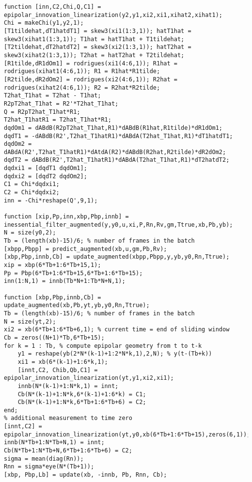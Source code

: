 \documentclass[]{article}
\begin{document}
\begin{tiny}
\begin{verbatim}
function [inn,C2,Chi,Q,C1] = epipolar_innovation_linearization(y2,y1,xi2,xi1,xihat2,xihat1);
Chi = makeChi(y1,y2,1); 
[T1tildehat,dT1hatdT1] = skew3(xi1(1:3,1)); hatT1hat = skew3(xihat1(1:3,1)); T1hat = hatT1hat + T1tildehat; 
[T2tildehat,dT2hatdT2] = skew3(xi2(1:3,1)); hatT2hat = skew3(xihat2(1:3,1)); T2hat = hatT2hat + T2tildehat; 
[R1tilde,dR1dOm1] = rodrigues(xi1(4:6,1)); R1hat = rodrigues(xihat1(4:6,1)); R1 = R1hat*R1tilde;
[R2tilde,dR2dOm2] = rodrigues(xi2(4:6,1)); R2hat = rodrigues(xihat2(4:6,1)); R2 = R2hat*R2tilde;
T2hat_T1hat = T2hat - T1hat;
R2pT2hat_T1hat = R2'*T2hat_T1hat;
Q = R2pT2hat_T1hat*R1;
T2hat_T1hatR1 = T2hat_T1hat*R1;
dqdOm1 = dABdB(R2pT2hat_T1hat,R1)*dABdB(R1hat,R1tilde)*dR1dOm1;
dqdT1 = -dABdB(R2',T2hat_T1hatR1)*dABdA(T2hat_T1hat,R1)*dT1hatdT1;
dqdOm2 = dABdA(R2',T2hat_T1hatR1)*dAtdA(R2)*dABdB(R2hat,R2tilde)*dR2dOm2;
dqdT2 = dABdB(R2',T2hat_T1hatR1)*dABdA(T2hat_T1hat,R1)*dT2hatdT2;
dqdxi1 = [dqdT1 dqdOm1];
dqdxi2 = [dqdT2 dqdOm2];
C1 = Chi*dqdxi1;
C2 = Chi*dqdxi2;
inn = -Chi*reshape(Q',9,1);

function [xip,Pp,inn,xbp,Pbp,innb] = inessential_filter_augmented(y,y0,u,xi,P,Rn,Rv,gm,Ttrue,xb,Pb,yb);
N = size(y0,2);
Tb = (length(xb)-15)/6; % number of frames in the batch
[xbpp,Pbpp] = predict_augmented(xb,u,gm,Pb,Rv);
[xbp,Pbp,innb,Cb] = update_augmented(xbpp,Pbpp,y,yb,y0,Rn,Ttrue);
xip = xbp(6*Tb+1:6*Tb+15,1);
Pp = Pbp(6*Tb+1:6*Tb+15,6*Tb+1:6*Tb+15);
inn(1:N,1) = innb(Tb*N+1:Tb*N+N,1);

function [xbp,Pbp,innb,Cb] = update_augmented(xb,Pb,yt,yb,y0,Rn,Ttrue);
Tb = (length(xb)-15)/6; % number of frames in the batch
N = size(yt,2);
xi2 = xb(6*Tb+1:6*Tb+6,1); % current time = end of sliding window
Cb = zeros((N+1)*Tb,6*Tb+15);
for k = 1 : Tb, % compute epipolar geometry from t to t-k
    y1 = reshape(yb(2*N*(k-1)+1:2*N*k,1),2,N); % y(t-(Tb+k))
    xi1 = xb(6*(k-1)+1:6*k,1);
    [innt,C2, Chib,Qb,C1] = epipolar_innovation_linearization(yt,y1,xi2,xi1);
    innb(N*(k-1)+1:N*k,1) = innt;
    Cb(N*(k-1)+1:N*k,6*(k-1)+1:6*k) = C1; 
    Cb(N*(k-1)+1:N*k,6*Tb+1:6*Tb+6) = C2; 
end;
% additional measurement to time zero
[innt,C2] = epipolar_innovation_linearization(yt,y0,xb(6*Tb+1:6*Tb+15),zeros(6,1)); 
innb(N*Tb+1:N*Tb+N,1) = innt;
Cb(N*Tb+1:N*Tb+N,6*Tb+1:6*Tb+6) = C2;
sigma = mean(diag(Rn));
Rnn = sigma*eye(N*(Tb+1));
[xbp, Pbp,Lb] = update(xb, -innb, Pb, Rnn, Cb);
\end{verbatim}
\end{tiny}
\end{document}
